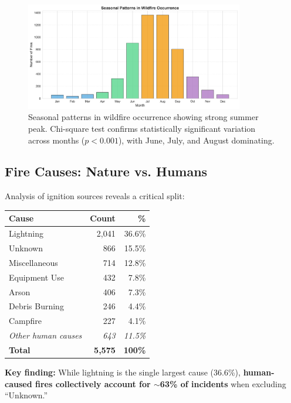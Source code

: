 \documentclass[11pt,a4paper]{article}
\begin{document}
\begin{figure}[h]
\centering
\includegraphics[width=0.85\textwidth]{seasonality.png}
\caption{Seasonal patterns in wildfire occurrence showing strong summer peak. Chi-square test confirms statistically significant variation across months ($p < 0.001$), with June, July, and August dominating.}
\label{fig:seasonality}
\end{figure}

\subsection{Fire Causes: Nature vs. Humans}

Analysis of ignition sources reveals a critical split:

\begin{center}
\begin{tabular}{lrr}
\toprule
\textbf{Cause} & \textbf{Count} & \textbf{\%} \\
\midrule
Lightning & 2,041 & 36.6\% \\
Unknown & 866 & 15.5\% \\
Miscellaneous & 714 & 12.8\% \\
Equipment Use & 432 & 7.8\% \\
Arson & 406 & 7.3\% \\
Debris Burning & 246 & 4.4\% \\
Campfire & 227 & 4.1\% \\
\textit{Other human causes} & \textit{643} & \textit{11.5\%} \\
\midrule
\textbf{Total} & \textbf{5,575} & \textbf{100\%} \\
\bottomrule
\end{tabular}
\end{center}

\textbf{Key finding:} While lightning is the single largest cause (36.6\%), \textbf{human-caused fires collectively account for $\sim$63\% of incidents} when excluding ``Unknown.''
\end{document}
